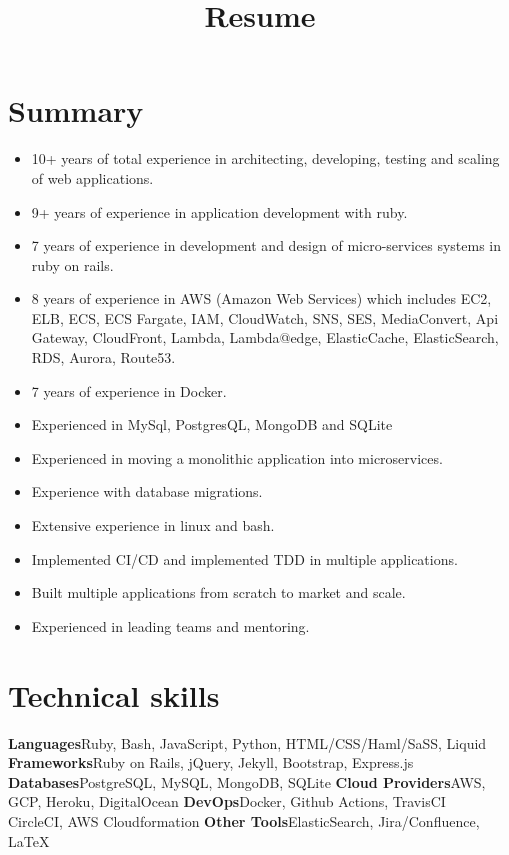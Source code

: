 \documentclass[11pt,a4paper]{moderncv}
\title{Resume}
\begin{document}
\maketitle


\section{Summary}
\begin{itemize}
    \setlength\itemsep{5pt}
    \item 10+ years of total experience in architecting, developing, testing and scaling of web applications.
    \item 9+ years of experience in application development with ruby.
    \item 7 years of experience in development and design of micro-services systems in ruby on rails.
    \item 8 years of experience in AWS (Amazon Web Services) which includes EC2, ELB, ECS, ECS Fargate, IAM, CloudWatch, SNS, SES, MediaConvert, Api Gateway, CloudFront, Lambda, Lambda@edge, ElasticCache, ElasticSearch, RDS, Aurora, Route53.
    \item 7 years of experience in Docker.
    \item Experienced in MySql, PostgresQL, MongoDB and SQLite
    \item Experienced in moving a monolithic application into microservices.
    \item Experience with database migrations.
    \item Extensive experience in linux and bash.
    \item Implemented CI/CD and implemented TDD in multiple applications.
    \item Built multiple applications from scratch to market and scale.
    \item Experienced in leading teams and mentoring.
    
\end{itemize}

\vspace{10pt}
\section{Technical skills}
\cvcomputer
{\textbf{Languages}}{Ruby, Bash, JavaScript, Python, HTML/CSS/Haml/SaSS, Liquid}
{\textbf{Frameworks}}{Ruby on Rails, jQuery, Jekyll, Bootstrap, Express.js}
\vspace{10pt}
\cvcomputer
{\textbf{Databases}}{PostgreSQL, MySQL, MongoDB, SQLite}
{\textbf{Cloud Providers}}{AWS, GCP, Heroku, DigitalOcean}
\vspace{10pt}
\cvcomputer
{\textbf{DevOps}}{Docker, Github Actions, TravisCI \\ CircleCI, AWS Cloudformation}
{\textbf{Other Tools}}{ElasticSearch, Jira/Confluence, \LaTeX}
\end{document}
